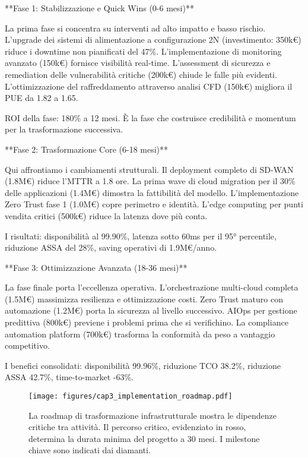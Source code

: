 \documentclass[12pt,a4paper,twoside]{book}
\begin{document}
**Fase 1: Stabilizzazione e Quick Wins (0-6 mesi)**

La prima fase si concentra su interventi ad alto impatto e basso rischio. L'upgrade dei sistemi di alimentazione a configurazione 2N (investimento: 350k€) riduce i downtime non pianificati del 47\%. L'implementazione di monitoring avanzato (150k€) fornisce visibilità real-time. L'assessment di sicurezza e remediation delle vulnerabilità critiche (200k€) chiude le falle più evidenti. L'ottimizzazione del raffreddamento attraverso analisi CFD (150k€) migliora il PUE da 1.82 a 1.65.

ROI della fase: 180\% a 12 mesi. È la fase che costruisce credibilità e momentum per la trasformazione successiva.

**Fase 2: Trasformazione Core (6-18 mesi)**

Qui affrontiamo i cambiamenti strutturali. Il deployment completo di SD-WAN (1.8M€) riduce l'MTTR a 1.8 ore. La prima wave di cloud migration per il 30\% delle applicazioni (1.4M€) dimostra la fattibilità del modello. L'implementazione Zero Trust fase 1 (1.0M€) copre perimetro e identità. L'edge computing per punti vendita critici (500k€) riduce la latenza dove più conta.

I risultati: disponibilità al 99.90\%, latenza sotto 60ms per il 95° percentile, riduzione ASSA del 28\%, saving operativi di 1.9M€/anno.

**Fase 3: Ottimizzazione Avanzata (18-36 mesi)**

La fase finale porta l'eccellenza operativa. L'orchestrazione multi-cloud completa (1.5M€) massimizza resilienza e ottimizzazione costi. Zero Trust maturo con automazione (1.2M€) porta la sicurezza al livello successivo. AIOps per gestione predittiva (800k€) previene i problemi prima che si verifichino. La compliance automation platform (700k€) trasforma la conformità da peso a vantaggio competitivo.

I benefici consolidati: disponibilità 99.96\%, riduzione TCO 38.2\%, riduzione ASSA 42.7\%, time-to-market -63\%.

\begin{figure}[htbp]
\centering
\texttt{[image: figures/cap3\_implementation\_roadmap.pdf]}
\caption{La roadmap di trasformazione infrastrutturale mostra le dipendenze critiche tra attività. Il percorso critico, evidenziato in rosso, determina la durata minima del progetto a 30 mesi. I milestone chiave sono indicati dai diamanti.}
\label{fig:roadmap}
\end{figure}
\end{document}
